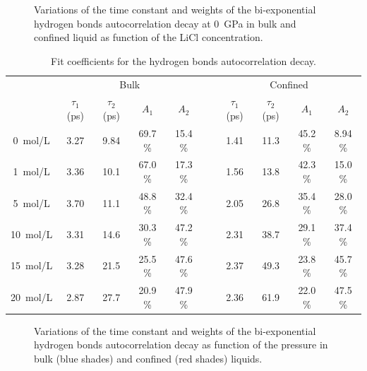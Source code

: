 \documentclass[thesis]{subfiles}
\begin{document}
\begin{figure}[ht]
    \centering
    
    \caption{Variations of the time constant and weights of the bi-exponential
    hydrogen bonds autocorrelation decay at \SI{0}{GPa} in bulk and confined
    liquid as function of the LiCl concentration.}
    \label{fig:licl-zif:hbonds:fit}
\end{figure}

\begin{table}[ht]
    \caption{Fit coefficients for the hydrogen bonds autocorrelation decay.}
    \label{table:licl-zif:hbonds}
    \centering
    \renewcommand{\arraystretch}{1.3}
    \begin{tabular}{c c c c c c c c c c}
        \toprule
        \multicolumn{1}{c}{~} & \multicolumn{4}{c}{Bulk}                          &~& \multicolumn{4}{c}{Confined} \\
        \multicolumn{1}{c}{~} & $\tau_1$ (ps) & $\tau_2$ (ps) & $A_1$   & $A_2$   &~& $\tau_1$ (ps) & $\tau_2$ (ps) & $A_1$   & $A_2$   \\
        \midrule
        \SI{0}{mol/L}         &    3.27       &    9.84       & 69.7 \% & 15.4 \% &~&  1.41         &  11.3         & 45.2 \% & 8.94 \% \\
        \SI{1}{mol/L}         &    3.36       &    10.1       & 67.0 \% & 17.3 \% &~&  1.56         &  13.8         & 42.3 \% & 15.0 \% \\
        \SI{5}{mol/L}         &    3.70       &    11.1       & 48.8 \% & 32.4 \% &~&  2.05         &  26.8         & 35.4 \% & 28.0 \% \\
        \SI{10}{mol/L}        &    3.31       &    14.6       & 30.3 \% & 47.2 \% &~&  2.31         &  38.7         & 29.1 \% & 37.4 \% \\
        \SI{15}{mol/L}        &    3.28       &    21.5       & 25.5 \% & 47.6 \% &~&  2.37         &  49.3         & 23.8 \% & 45.7 \% \\
        \SI{20}{mol/L}        &    2.87       &    27.7       & 20.9 \% & 47.9 \% &~&  2.36         &  61.9         & 22.0 \% & 47.5 \% \\
        \bottomrule
    \end{tabular}
\end{table}

\begin{figure}[ht]
    \centering
    
    \caption{Variations of the time constant and weights of the bi-exponential
    hydrogen bonds autocorrelation decay as function of the pressure in bulk
    (blue shades) and confined (red shades) liquids.}
    \label{fig:licl-zif:hbonds:fit:pressure}
\end{figure}
\end{document}

